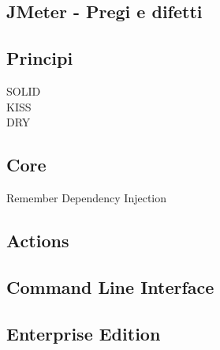 \subsection{JMeter - Pregi e difetti}
\subsection{Principi}
SOLID\\
KISS\\
DRY
\subsection{Core}
Remember Dependency Injection
\subsection{Actions}
\subsection{Command Line Interface}
\subsection{Enterprise Edition}